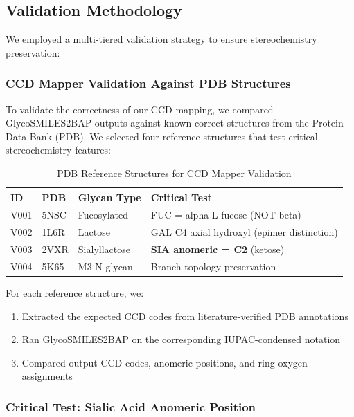 
\subsection{Validation Methodology}
\label{sec:validation_method}

We employed a multi-tiered validation strategy to ensure stereochemistry preservation:

\subsubsection{CCD Mapper Validation Against PDB Structures}

To validate the correctness of our CCD mapping, we compared GlycoSMILES2BAP outputs against known correct structures from the Protein Data Bank (PDB). We selected four reference structures that test critical stereochemistry features:

\begin{table}[h]
\centering
\caption{PDB Reference Structures for CCD Mapper Validation}
\begin{tabular}{lllp{5cm}}
\toprule
ID & PDB & Glycan Type & Critical Test \\
\midrule
V001 & 5NSC & Fucosylated & FUC = alpha-L-fucose (NOT beta) \\
V002 & 1L6R & Lactose & GAL C4 axial hydroxyl (epimer distinction) \\
V003 & 2VXR & Sialyllactose & \textbf{SIA anomeric = C2} (ketose) \\
V004 & 5K65 & M3 N-glycan & Branch topology preservation \\
\bottomrule
\end{tabular}
\end{table}

For each reference structure, we:
\begin{enumerate}
    \item Extracted the expected CCD codes from literature-verified PDB annotations
    \item Ran GlycoSMILES2BAP on the corresponding IUPAC-condensed notation
    \item Compared output CCD codes, anomeric positions, and ring oxygen assignments
\end{enumerate}

\subsubsection{Critical Test: Sialic Acid Anomeric Position}

